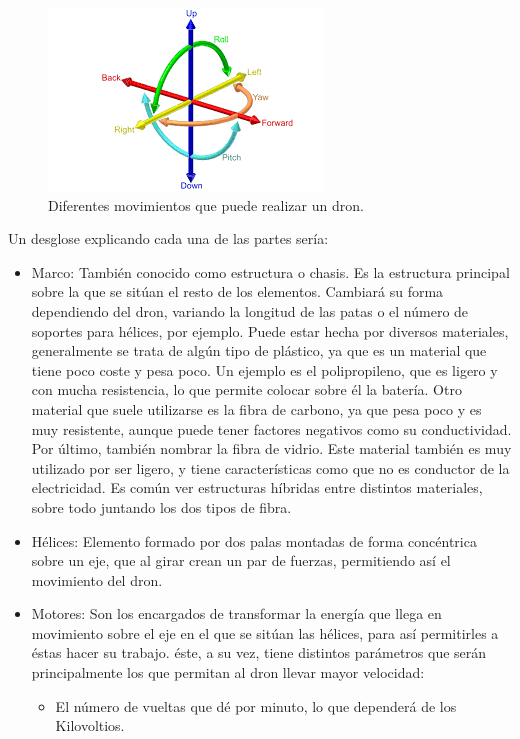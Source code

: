 \begin{figure}[H]
  \centering
  \includegraphics[scale=0.8]{imagenes/pitchRolYaw.png}
  \caption{Diferentes movimientos que puede realizar un dron.}
  \label{fig:gnat}
\end{figure}

Un desglose explicando cada una de las partes sería:
\begin{itemize}
\item Marco: También conocido como estructura o chasis. Es la estructura
principal sobre la que se sitúan el resto de los elementos. Cambiará su forma
dependiendo del dron, variando la longitud de las patas o el número de soportes
para hélices, por ejemplo. Puede estar hecha por diversos materiales, generalmente se
trata de algún tipo de plástico, ya que es un material que tiene poco coste y pesa poco.
Un ejemplo es el polipropileno, que es ligero y con mucha resistencia, lo que permite
colocar sobre él la batería. Otro material que suele utilizarse es la fibra de carbono,
ya que pesa poco y es muy resistente, aunque puede tener factores negativos como su
conductividad. Por último, también nombrar la fibra de vidrio. Este material también
es muy utilizado por ser ligero, y tiene características como que no es conductor de la
electricidad. Es común ver estructuras híbridas entre distintos materiales, sobre todo
juntando los dos tipos de fibra.
\item Hélices: Elemento formado por dos palas montadas de forma concéntrica
sobre un eje, que al girar crean un par de fuerzas, permitiendo así el movimiento del
dron.
\item Motores: Son los encargados de transformar la energía que llega en
movimiento sobre el eje en el que se sitúan las hélices, para así permitirles a éstas
hacer su trabajo. éste, a su vez, tiene distintos parámetros que serán principalmente
los que permitan al dron llevar mayor velocidad:
	\begin{itemize}
	\item El número de vueltas que dé por minuto, lo que dependerá de los Kilovoltios.

\end{itemize}
\end{itemize}
